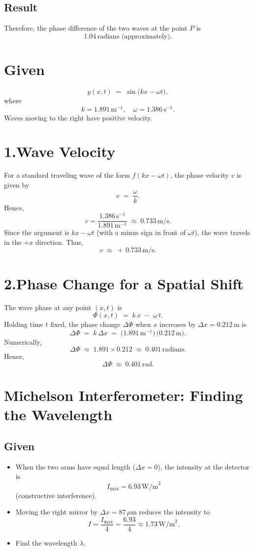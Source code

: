 \documentclass[12pt]{article}
\theoremstyle{definition} %
\theoremstyle{plain} %
\begin{document}
\subsection*{Result}
Therefore, the phase difference of the two waves at the point $P$ is
\[
  \boxed{1.04\,\text{radians (approximately)}.}
\]


\section*{Given}
\[
  y(x,t) \;=\; \sin\bigl(kx - \omega t\bigr),
\]
where
\[
  k = 1.891\,\mathrm{m}^{-1},
  \quad 
  \omega = 1.386\,\mathrm{s}^{-1}.
\]
Waves moving to the right have positive velocity.

\section*{1.\;Wave Velocity}
For a standard traveling wave of the form $f(kx - \omega t)$, 
the phase velocity $v$ is given by
\[
  v \;=\; \frac{\omega}{k}.
\]
Hence,
\[
  v = \frac{1.386\,\mathrm{s}^{-1}}{1.891\,\mathrm{m}^{-1}}
    \;\approx\; 0.733\,\mathrm{m/s}.
\]
Since the argument is $kx - \omega t$ (with a minus sign in front of $\omega t$),
the wave travels in the $+x$ direction. Thus, 
\[
  \boxed{v \;\approx\; +\,0.733\,\mathrm{m/s}.}
\]

\section*{2.\;Phase Change for a Spatial Shift}
The wave phase at any point $(x,t)$ is
\[
  \Phi(x,t) \;=\; k\,x \;-\; \omega\,t.
\]
Holding time $t$ fixed, the phase change $\Delta \Phi$ when $x$ increases by 
$\Delta x = 0.212\,\mathrm{m}$ is
\[
  \Delta \Phi 
  \;=\; k\,\Delta x
  \;=\; \bigl(1.891\,\mathrm{m}^{-1}\bigr)\,\bigl(0.212\,\mathrm{m}\bigr).
\]
Numerically,
\[
  \Delta \Phi 
  \;\approx\; 1.891 \times 0.212
  \;\approx\; 0.401\,\mathrm{radians}.
\]
Hence, 
\[
  \boxed{\Delta \Phi \;\approx\; 0.401\,\mathrm{rad}.}
\]

\section*{Michelson Interferometer: Finding the Wavelength}

\subsection*{Given}
\begin{itemize}
\item When the two arms have equal length ($\Delta x = 0$), the intensity at the detector is 
  \[
    I_{\max} = 6.93 \,\text{W/m}^2
  \]
  (constructive interference).
\item Moving the right mirror by $\Delta x = 87\,\mu\mathrm{m}$ 
  reduces the intensity to
  \[
    I = \frac{I_{\max}}{4} = \frac{6.93}{4} \approx 1.73\,\text{W/m}^2.
  \]
\item Find the wavelength \(\lambda\).
\end{itemize}
\end{document}
